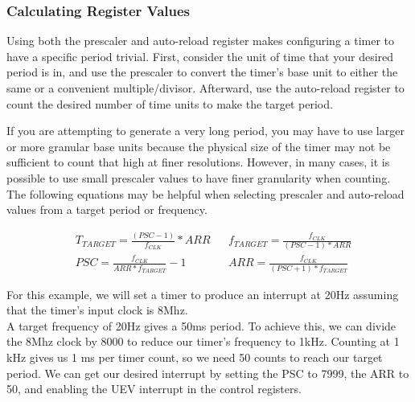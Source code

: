 \documentclass[openany,11pt,fleqn]{book} %
\begin{document}
    \subsubsection{Calculating Register Values}
        Using both the prescaler and auto-reload register makes configuring a timer to have a specific period trivial. First, consider the unit of time that your desired period is in, and use the prescaler to convert the timer's base unit to either the same or a convenient multiple/divisor. Afterward, use the auto-reload register to count the desired number of time units to make the target period. 
        
        If you are attempting to generate a very long period, you may have to use larger or more granular base units because the physical size of the timer may not be sufficient to count that high at finer resolutions. However, in many cases, it is possible to use small prescaler values to have finer granularity when counting.
        The following equations may be helpful when selecting prescaler and auto-reload values from a target period or frequency. 
        
        \begin{align*}
            & T_{TARGET} = \frac{(PSC-1)}{f_{CLK}} * ARR & & f_{TARGET} = \frac{f_{CLK}}{(PSC-1) * ARR}\\[1em]
            & PSC = \frac{f_{CLK}}{ARR * f_{TARGET}}-1 & & ARR = \frac{f_{CLK}}{(PSC+1) * f_{TARGET}}
        \end{align*}
        	
            
        \begin{center}
            \begin{example} 
                \label{example1}
            For this example, we will set a timer to produce an interrupt at 20Hz assuming that the timer's input clock is 8Mhz. \\
            
            A target frequency of 20Hz gives a 50ms period. To achieve this, we can divide the 8Mhz clock by 8000 to reduce our timer's frequency to 1kHz. Counting at 1 kHz gives us 1 ms per timer count, so we need 50 counts to reach our target period. We can get our desired interrupt by setting the PSC to 7999, the ARR to 50, and enabling the UEV interrupt in the control registers.  
            \end{example}
        \end{center}
        
\end{document}
